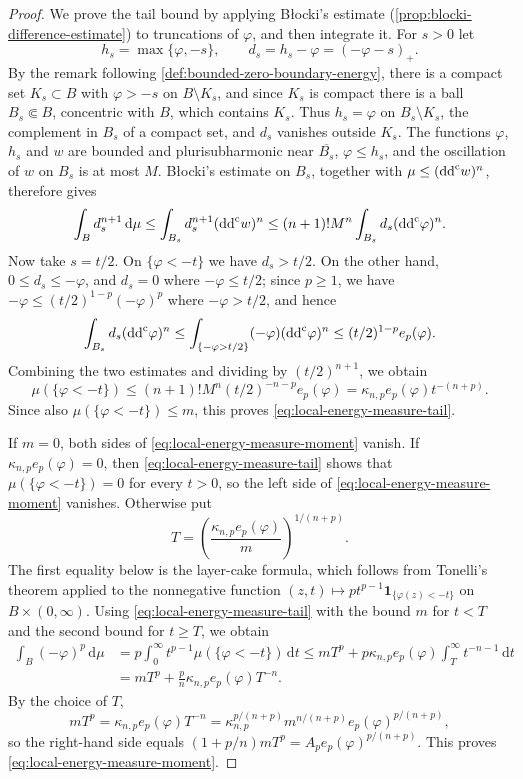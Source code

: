 \begin{proof}
We prove the tail bound by applying B\l{}ocki's estimate (\cref{prop:blocki-difference-estimate}) to truncations of $\varphi$, and then integrate it. For $s>0$ let
\[
 h_s=\max\{\varphi,-s\},\qquad d_s=h_s-\varphi=(-\varphi-s)_+.
\]
By the remark following \cref{def:bounded-zero-boundary-energy}, there is a compact set $K_s\subset B$ with $\varphi>-s$ on $B\setminus K_s$, and since $K_s$ is compact there is a ball $B_s\Subset B$, concentric with $B$, which contains $K_s$. Thus $h_s=\varphi$ on $B_s\setminus K_s$, the complement in $B_s$ of a compact set, and $d_s$ vanishes outside $K_s$. The functions $\varphi$, $h_s$ and $w$ are bounded and plurisubharmonic near $\overline{B_s}$, $\varphi\le h_s$, and the oscillation of $w$ on $B_s$ is at most $M$. B\l{}ocki's estimate on $B_s$, together with $\mu\leq(\mathrm{dd}^{\mathrm{c}} w)^n$, therefore gives
\[
 \int_B d_s^{n+1}\,\mathrm d\mu
  \leq\int_{B_s}d_s^{n+1}(\mathrm{dd}^{\mathrm{c}} w)^n
  \leq(n+1)!M^n\int_{B_s}d_s(\mathrm{dd}^{\mathrm{c}}\varphi)^n.
\]
Now take $s=t/2$. On $\{\varphi<-t\}$ we have $d_s>t/2$. On the other hand, $0\le d_s\le-\varphi$, and $d_s=0$ where $-\varphi\le t/2$; since $p\geq1$, we have $-\varphi\le(t/2)^{1-p}(-\varphi)^p$ where $-\varphi>t/2$, and hence
\[
 \int_{B_s}d_s(\mathrm{dd}^{\mathrm{c}}\varphi)^n
  \leq\int_{\{-\varphi>t/2\}}(-\varphi)(\mathrm{dd}^{\mathrm{c}}\varphi)^n
  \leq(t/2)^{1-p}e_p(\varphi).
\]
Combining the two estimates and dividing by $(t/2)^{n+1}$, we obtain
\[
 \mu(\{\varphi<-t\})\le(n+1)!M^n(t/2)^{-n-p}e_p(\varphi)=\kappa_{n,p}e_p(\varphi)t^{-(n+p)}.
\]
Since also $\mu(\{\varphi<-t\})\le m$, this proves \eqref{eq:local-energy-measure-tail}.

If $m=0$, both sides of \eqref{eq:local-energy-measure-moment} vanish. If $\kappa_{n,p}e_p(\varphi)=0$, then \eqref{eq:local-energy-measure-tail} shows that $\mu(\{\varphi<-t\})=0$ for every $t>0$, so the left side of \eqref{eq:local-energy-measure-moment} vanishes. Otherwise put
\[
 T=\left(\frac{\kappa_{n,p}e_p(\varphi)}m\right)^{1/(n+p)}.
\]
The first equality below is the layer-cake formula, which follows from Tonelli's theorem applied to the nonnegative function $(z,t)\mapsto pt^{p-1}\mathbf1_{\{\varphi(z)<-t\}}$ on $B\times(0,\infty)$. Using \eqref{eq:local-energy-measure-tail} with the bound $m$ for $t<T$ and the second bound for $t\ge T$, we obtain
\[
 \begin{aligned}
 \int_B(-\varphi)^p\,\mathrm d\mu
 &=p\int_0^\infty t^{p-1}\mu(\{\varphi<-t\})\,\mathrm dt
 \leq mT^p
       +p\kappa_{n,p}e_p(\varphi)\int_T^\infty t^{-n-1}\,\mathrm dt\\
 &=mT^p+\frac pn\kappa_{n,p}e_p(\varphi)T^{-n}.
 \end{aligned}
\]
By the choice of $T$,
\[
 mT^p=\kappa_{n,p}e_p(\varphi)T^{-n}=\kappa_{n,p}^{p/(n+p)}m^{n/(n+p)}e_p(\varphi)^{p/(n+p)},
\]
so the right-hand side equals $(1+p/n)mT^p=A_pe_p(\varphi)^{p/(n+p)}$. This proves \eqref{eq:local-energy-measure-moment}.
\end{proof}

